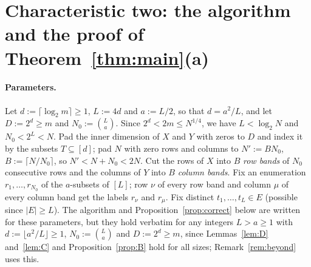 \documentclass[11pt]{article}
\theoremstyle{definition}
\theoremstyle{remark}
\newcommand{\Nz}{N_0}
\begin{document}
\section{Characteristic two: the algorithm and the proof of Theorem~\ref{thm:main}(a)}\label{sec:char2}

\paragraph{Parameters.} Let $d:=\lceil\log_2m\rceil\ge1$, $L:=4d$ and $a:=L/2$, so that $d=a^2/L$, and let $D:=2^d\ge m$ and $\Nz:=\binom La$. Since $2^d<2m\le N^{1/4}$, we have $L<\log_2N$ and $\Nz<2^L<N$. Pad the inner dimension of $X$ and $Y$ with zeros to $D$ and index it by the subsets $T\subseteq[d]$; pad $N$ with zero rows and columns to $N':=B\Nz$, $B:=\lceil N/\Nz\rceil$, so $N'<N+\Nz<2N$. Cut the rows of $X$ into $B$ \emph{row bands} of $\Nz$ consecutive rows and the columns of $Y$ into $B$ \emph{column bands}. Fix an enumeration $r_1,\dots,r_{\Nz}$ of the $a$-subsets of $[L]$; row $\nu$ of every row band and column $\mu$ of every column band get the labels $r_\nu$ and $r_\mu$. Fix distinct $t_1,\dots,t_L\in E$ (possible since $|E|\ge L$). The algorithm and Proposition~\ref{prop:correct} below are written for these parameters, but they hold verbatim for any integers $L>a\ge1$ with $d:=\lfloor a^2/L\rfloor\ge1$, $\Nz:=\binom La$ and $D:=2^d\ge m$, since Lemmas~\ref{lem:D} and~\ref{lem:C} and Proposition~\ref{prop:B} hold for all sizes; Remark~\ref{rem:beyond} uses this.
\end{document}
